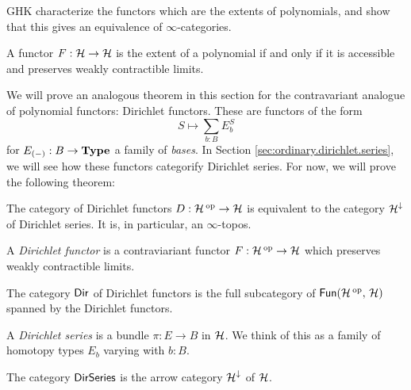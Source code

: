 GHK characterize the functors which are the extents of polynomials, and show
that this gives an equivalence of $\infty$-categories.
\begin{thm}
A functor $F : \operatorname{\mathcal{H}} \to \operatorname{\mathcal{H}}$ is the extent of a polynomial if and only if it is
accessible and preserves weakly contractible limits.
\end{thm}

We will prove an analogous theorem in this section for the contravariant
analogue of polynomial functors: Dirichlet functors. These are functors of the
form
$$S \mapsto \sum_{b : B} E_b^S$$
for $E_{(-)} : B \to \operatorname{\textbf{Type}}$ a family of \emph{bases}. In Section
\ref{sec:ordinary.dirichlet.series}, we will see how these functors categorify
Dirichlet series. For now, we will prove the following theorem:
\begin{thm}
The category of Dirichlet functors $D : \operatorname{\mathcal{H}}\operatorname{^\text{op}} \to \operatorname{\mathcal{H}}$ is equivalent to the
category $\operatorname{\mathcal{H}}^{\downarrow}$ of Dirichlet series. It is, in particular, an $\infty$-topos.
\end{thm}


\begin{defn}
A \emph{Dirichlet functor} is a contraviariant functor $F : \operatorname{\mathcal{H}}\operatorname{^\text{op}} \to \operatorname{\mathcal{H}}$
which preserves weakly contractible limits.

The category $\operatorname{\mathsf{{Dir}}}$ of Dirichlet functors is the full subcategory of
$\operatorname{\mathsf{{Fun}}}(\operatorname{\mathcal{H}}\operatorname{^\text{op}},\, \operatorname{\mathcal{H}})$ spanned by the Dirichlet functors.
\end{defn}

\begin{defn}
A \emph{Dirichlet series} is a bundle $\pi : E \to B$ in $\operatorname{\mathcal{H}}$. We think of this
as a family of homotopy types $E_b$ varying with $b : B$.

The category $\operatorname{\mathsf{{DirSeries}}}$ is the arrow category $\operatorname{\mathcal{H}}^{\downarrow}$ of $\operatorname{\mathcal{H}}$.
\end{defn}

